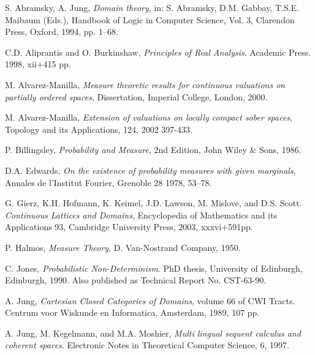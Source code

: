 \documentclass[12pt,a4paper]{article}
\theoremstyle{definition}
\theoremstyle{theorem}
\theoremstyle{definition}
\begin{document}
\newpage
\normalsize
\small
\setLTRbibitems
\begin{thebibliography}{99}
\resetlatinfont

S. Abramsky, A. Jung, {\em Domain theory}, in: S. Abramsky, D.M. Gabbay, T.S.E. Maibaum (Eds.), Handbook of
Logic in Computer Science, Vol. 3, Clarendon Press, Oxford, 1994, pp. 1–68.

C.D. Aliprantis and O. Burkinshaw,   {\em Principles of Real Analysis}.  Academic Press.  1998,  xii+415 pp.

M. Alvarez-Manilla, {\em Measure theoretic results for continuous valuations on partially ordered
spaces}, Dissertation, Imperial College, London, 2000.

M. Alvarez-Manilla, {\em Extension of valuations on locally compact sober spaces}, Topology and its
Applications, 124, 2002 397-433.

P. Billingsley, {\em Probability and Measure}, 2nd Edition, John Wiley \& Sons, 1986.

D.A. Edwards, {\em On the existence of probability measures with given marginals}, Annales de
l’Institut Fourier, Grenoble 28 1978, 53–78.

G. Gierz, K.H. Hofmann, K. Keimel, J.D. Lawson, M. Mislove, and D.S. Scott. {\em Continuous
Lattices and Domains}, Encyclopedia of Mathematics and its Applications 93, Cambridge
University Press, 2003, xxxvi+591pp.

P. Halmos, {\em Measure Theory}, D. Van-Nostrand Company, 1950.

C. Jones,  {\em Probabilistic Non-Determinism}. PhD thesis, University of Edinburgh, Edinburgh,
1990. Also published as Technical Report No. CST-63-90.

A. Jung,  {\em Cartesian Closed Categories of Domains}, volume 66 of CWI Tracts. Centrum voor
Wiskunde en Informatica, Amsterdam, 1989, 107 pp.

A. Jung, M. Kegelmann, and M.A. Moshier,  {\em Multi lingual sequent calculus and coherent spaces}.
Electronic Notes in Theoretical Computer Science, 6, 1997.


\end{thebibliography}
\end{document}
